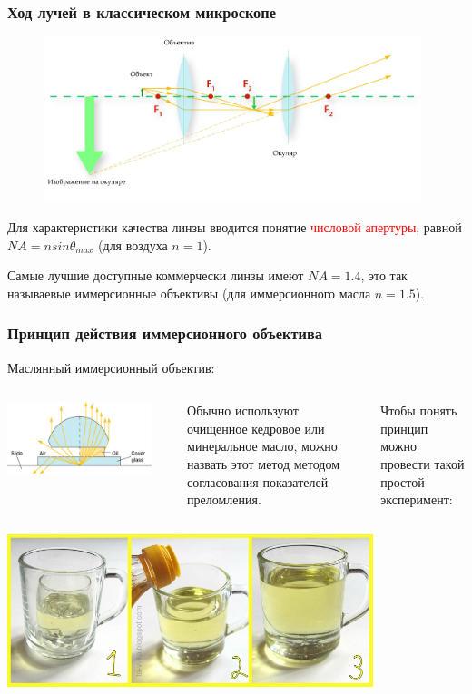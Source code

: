 \documentclass[9pt, compress, xcolor=table]{beamer}
\begin{document}
\begin{frame}[fragile]\frametitle{Ход лучей в классическом микроскопе}
\begin{figure}
\centering
\includegraphics[width=11cm]{Microscope2}
\end{figure}
Для характеристики качества линзы вводится понятие \textcolor{red}{числовой апертуры}, равной $NA=n sin \theta_{max}$ (для воздуха $n=1$).

Самые лучшие доступные коммерчески линзы имеют $NA=1.4$, это так называевые иммерсионные объективы (для иммерсионного масла $n=1.5$).
\end{frame}

\begin{frame}[fragile]\frametitle{Принцип действия иммерсионного объектива}
\textcolor{Mycolor1}{Маслянный иммерсионный объектив:}

\begin{columns}[c]
\column{8cm}

\includegraphics[width=0.9\textwidth]{oil}

\column{4cm}
Обычно используют очищенное кедровое или минеральное масло, можно назвать этот метод методом согласования показателей преломления.

Чтобы понять принцип можно провести такой простой эксперимент:
\end{columns}

\includegraphics[width=0.8\textwidth]{immerse}

\end{frame}
\end{document}
